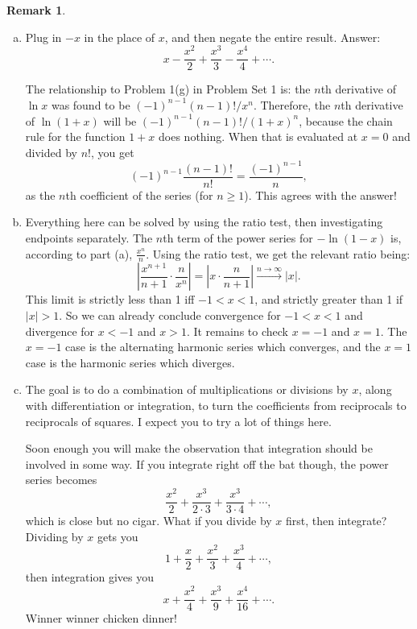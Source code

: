 \documentclass[11pt,oneside]{amsart}
\theoremstyle{definition}
\newtheorem{remark}{Remark}
\begin{document}
\begin{remark}
  \leavevmode\begin{enumerate}[(a)]
    \item Plug in $-x$ in the place of $x$, and then negate the entire result. Answer:
          \[x-\frac{x^2}2+\frac{x^3}3-\frac{x^4}4+\cdots.\]

          The relationship to Problem 1(g) in Problem Set 1 is: the $n$th derivative of $\ln x$ was found to be $(-1)^{n-1}(n-1)!/x^n$. Therefore, the $n$th derivative of $\ln(1+x)$ will be $(-1)^{n-1}(n-1)!/(1+x)^n$, because the chain rule for the function $1+x$ does nothing. When that is evaluated at $x=0$ and divided by $n!$, you get
          \[(-1)^{n-1}\frac{(n-1)!}{n!}=\frac{(-1)^{n-1}}n,\]
          as the $n$th coefficient of the series (for $n\geq 1$). This agrees with the answer!

    \item Everything here can be solved by using the ratio test, then investigating endpoints separately. The $n$th term of the power series for $-\ln(1-x)$ is, according to part (a), $\frac{x^n}n$. Using the ratio test, we get the relevant ratio being:
          \[\left|\frac{x^{n+1}}{n+1}\cdot \frac n{x^n}\right|=\left|x\cdot\frac n{n+1}\right|\xrightarrow{n\to\infty} |x|.\]
          This limit is strictly less than 1 iff $-1<x<1$, and strictly greater than 1 if $|x|>1$. So we can already conclude convergence for $-1<x<1$ and divergence for $x<-1$ and $x>1$. It remains to check $x=-1$ and $x=1$. The $x=-1$ case is the alternating harmonic series which converges, and the $x=1$ case is the harmonic series which diverges.

    \item The goal is to do a combination of multiplications or divisions by $x$, along with differentiation or integration, to turn the coefficients from reciprocals to reciprocals of squares. I expect you to try a lot of things here.

          Soon enough you will make the observation that integration should be involved in some way. If you integrate right off the bat though, the power series becomes
          \[\frac{x^2}2+\frac{x^3}{2\cdot 3}+\frac{x^3}{3\cdot 4}+\cdots,\]
          which is close but no cigar. What if you divide by $x$ first, then integrate? Dividing by $x$ gets you
          \[1+\frac x2+\frac{x^2}3+\frac{x^3}{4}+\cdots,\]
          then integration gives you
          \[x+\frac{x^2}4+\frac{x^3}9+\frac{x^4}{16}+\cdots.\]
          Winner winner chicken dinner!


\end{enumerate}
\end{remark}
\end{document}
